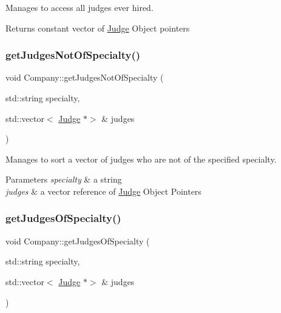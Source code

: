Manages to access all judges ever hired. 

\begin{DoxyReturn}{Returns}
constant vector of \hyperlink{class_judge}{Judge} Object pointers 
\end{DoxyReturn}
\mbox{\label{class_company_ad8f032997ab625e04324093ac20d83cf}} 
\subsubsection{\texorpdfstring{get\+Judges\+Not\+Of\+Specialty()}{getJudgesNotOfSpecialty()}}
{\footnotesize\ttfamily void Company\+::get\+Judges\+Not\+Of\+Specialty (\begin{DoxyParamCaption}\item[{std\+::string}]{specialty,  }\item[{std\+::vector$<$ \hyperlink{class_judge}{Judge} $\ast$$>$ \&}]{judges }\end{DoxyParamCaption})}



Manages to sort a vector of judges who are not of the specified specialty. 


\begin{DoxyParams}{Parameters}
{\em specialty} & a string \\
\hline
{\em judges} & a vector reference of \hyperlink{class_judge}{Judge} Object Pointers \\
\hline
\end{DoxyParams}
\mbox{\label{class_company_ad8d86971b1fb7acb622c1eef3db1fa4e}} 
\subsubsection{\texorpdfstring{get\+Judges\+Of\+Specialty()}{getJudgesOfSpecialty()}}
{\footnotesize\ttfamily void Company\+::get\+Judges\+Of\+Specialty (\begin{DoxyParamCaption}\item[{std\+::string}]{specialty,  }\item[{std\+::vector$<$ \hyperlink{class_judge}{Judge} $\ast$$>$ \&}]{judges }\end{DoxyParamCaption})}



